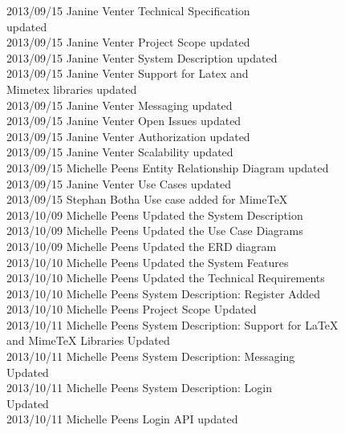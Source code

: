 \documentclass[29pt,a4paper]{moderncv}
\begin{document}
\begin{tabbing}
2013/09/15  \>  Janine Venter \> Technical Specification \\ \> \> \> updated\\
2013/09/15  \> Janine Venter \> Project Scope updated\\
2013/09/15  \>  Janine Venter \> System Description updated\\
2013/09/15 \> Janine Venter \> Support for Latex and \\ \> \> \> Mimetex libraries updated\\
2013/09/15  \> Janine Venter \> Messaging updated\\
2013/09/15  \>  Janine Venter \> Open Issues updated\\
2013/09/15  \> Janine Venter \> Authorization updated\\
2013/09/15  \> Janine Venter \> Scalability updated\\
2013/09/15  \> Michelle Peens \> Entity Relationship Diagram updated\\
2013/09/15  \> Janine Venter \> Use Cases updated\\
2013/09/15  \> Stephan Botha \> Use case added for MimeTeX\\
2013/10/09  \> Michelle Peens \> Updated the System Description\\
2013/10/09  \> Michelle Peens \> Updated the Use Case Diagrams\\
2013/10/09  \> Michelle Peens \> Updated the ERD diagram\\
2013/10/10  \> Michelle Peens \> Updated the System Features\\
2013/10/10  \> Michelle Peens \> Updated the Technical Requirements\\
2013/10/10  \> Michelle Peens \> System Description: Register Added\\
2013/10/10  \> Michelle Peens \> Project Scope Updated\\
2013/10/11  \> Michelle Peens \> System Description: Support for LaTeX \\ \> \> \> and MimeTeX Libraries Updated\\
2013/10/11  \> Michelle Peens \> System Description: Messaging \\ \> \> \> Updated\\
2013/10/11  \> Michelle Peens \> System Description: Login \\ \> \> \> Updated\\
2013/10/11  \> Michelle Peens \> Login API updated\\

\end{tabbing}
\end{document}
